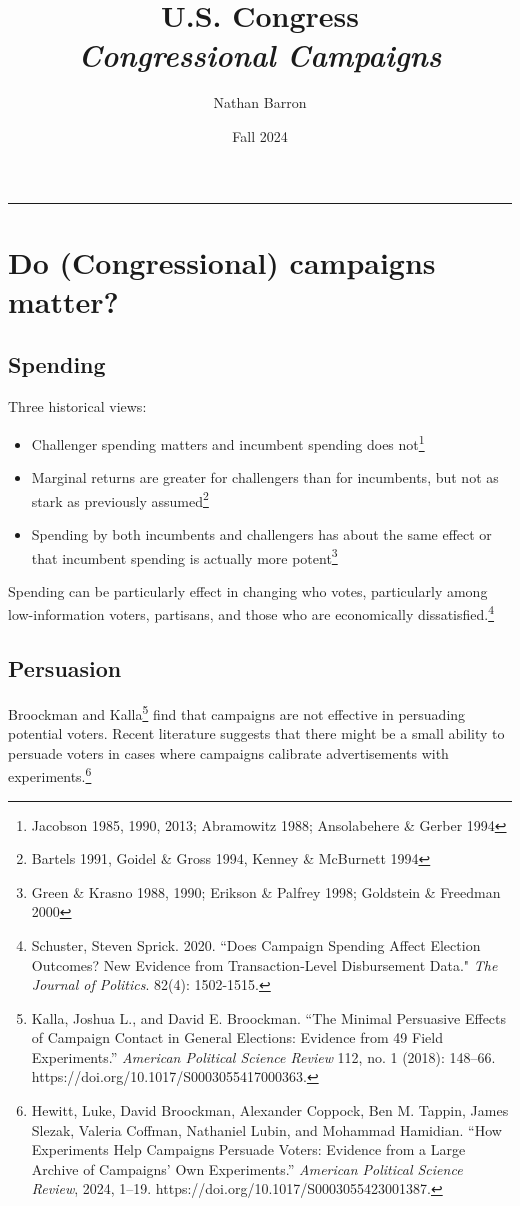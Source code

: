 \documentclass[10pt]{article}
\title{\textbf{U.S. Congress}\\\textit{Congressional Campaigns}}
\author{Nathan Barron}
\date{Fall 2024}
\begin{document}
	\maketitle
	\tableofcontents
	\vspace{.25in}
	\hrule
	\vspace{.25in}
	
	
	\section{Do (Congressional) campaigns matter?}
	
	
	\subsection{Spending}
	Three historical views: 
	\begin{itemize}
		\item Challenger spending matters and incumbent spending does not\footnote{ Jacobson 1985, 1990, 2013; Abramowitz 1988; Ansolabehere \& Gerber 1994}
		\item Marginal returns are greater for challengers than for incumbents, but not as stark as previously assumed\footnote{Bartels 1991,
			Goidel \& Gross 1994, Kenney \& McBurnett 1994}
		\item Spending by both incumbents and challengers has about the same effect or that incumbent spending is actually more potent\footnote{Green \& Krasno 1988, 1990; Erikson \& Palfrey 1998; Goldstein \& Freedman 2000}
	\end{itemize}
	
	Spending can be particularly effect in changing who votes, particularly among low-information voters, partisans, and those who are economically dissatisfied.\footnote{Schuster, Steven Sprick. 2020. ``Does Campaign Spending Affect Election Outcomes? New Evidence from Transaction-Level Disbursement Data." \textit{The Journal of Politics}. 82(4): 1502-1515.}
	
	\subsection{Persuasion}
	
	Broockman and Kalla\footnote{Kalla, Joshua L., and David E. Broockman. ``The Minimal Persuasive Effects of Campaign Contact in General Elections: Evidence from 49 Field Experiments.” \textit{American Political Science Review} 112, no. 1 (2018): 148–66. https://doi.org/10.1017/S0003055417000363.} find that campaigns are not effective in persuading potential voters. Recent literature suggests that there might be a small ability to persuade voters in cases where campaigns calibrate advertisements with experiments.\footnote{Hewitt, Luke, David Broockman, Alexander Coppock, Ben M. Tappin, James Slezak, Valeria Coffman, Nathaniel Lubin, and Mohammad Hamidian. “How Experiments Help Campaigns Persuade Voters: Evidence from a Large Archive of Campaigns’ Own Experiments.” \textit{American Political Science Review}, 2024, 1–19. https://doi.org/10.1017/S0003055423001387.}
	
\end{document}
